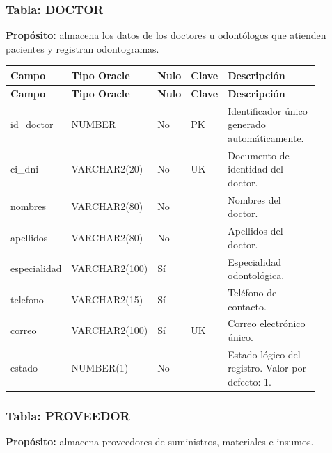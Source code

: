 \subsubsection{Tabla: DOCTOR}

\textbf{Propósito:} almacena los datos de los doctores u odontólogos que atienden pacientes y registran odontogramas.\par

\begin{longtable}{p{0.18\linewidth}p{0.18\linewidth}p{0.08\linewidth}p{0.08\linewidth}p{0.36\linewidth}}
\toprule
\textbf{Campo} & \textbf{Tipo Oracle} & \textbf{Nulo} & \textbf{Clave} & \textbf{Descripción} \\
\midrule
\endfirsthead
\toprule
\textbf{Campo} & \textbf{Tipo Oracle} & \textbf{Nulo} & \textbf{Clave} & \textbf{Descripción} \\
\midrule
\endhead
id\_doctor & NUMBER & No & PK & Identificador único generado automáticamente. \\
ci\_dni & VARCHAR2(20) & No & UK & Documento de identidad del doctor. \\
nombres & VARCHAR2(80) & No &  & Nombres del doctor. \\
apellidos & VARCHAR2(80) & No &  & Apellidos del doctor. \\
especialidad & VARCHAR2(100) & Sí &  & Especialidad odontológica. \\
telefono & VARCHAR2(15) & Sí &  & Teléfono de contacto. \\
correo & VARCHAR2(100) & Sí & UK & Correo electrónico único. \\
estado & NUMBER(1) & No &  & Estado lógico del registro. Valor por defecto: 1. \\
\bottomrule
\end{longtable}



\subsubsection{Tabla: PROVEEDOR}

\textbf{Propósito:} almacena proveedores de suministros, materiales e insumos.\par


